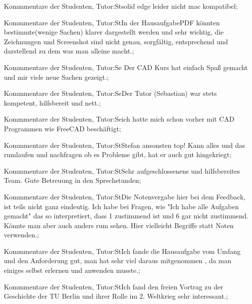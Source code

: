 \documentclass[10pt]{beamer}
\begin{document}
\begin{frame}[fragile]{Kommmentare der Studenten, Tutor:St}solid edge leider nicht mac kompatibel;
 \end{frame}
\begin{frame}[fragile]{Kommmentare der Studenten, Tutor:St}In der HausaufgabePDF könnten bestimmte(wenige Sachen) klarer dargestellt werden und sehr wichtig, die Zeichnungen und Screenshot sind nicht genau, sorgfältig, entsprechend und darstellend zu dem was man alleine macht.;
 \end{frame}
\begin{frame}[fragile]{Kommmentare der Studenten, Tutor:Se}
 Der CAD Kurs hat einfach Spaß gemacht und mir viele neue Sachen gezeigt.;
 \end{frame}
\begin{frame}[fragile]{Kommmentare der Studenten, Tutor:Se}Der Tutor (Sebastian) war stets kompetent, hilfsbereit und nett.;
 \end{frame}
\begin{frame}[fragile]{Kommmentare der Studenten, Tutor:Se}ich hatte mich schon vorher mit CAD Programmen wie FreeCAD beschäftigt;
 \end{frame}
\begin{frame}[fragile]{Kommmentare der Studenten, Tutor:St}Stefan ansonsten top! Kann alles und das rumlaufen und nachfragen ob es Probleme gibt, hat er auch gut hingekriegt;
 \end{frame}
\begin{frame}[fragile]{Kommmentare der Studenten, Tutor:St}Sehr aufgeschlossenens und hilfsbereites Team. Gute Betreuung in den Sprechstunden;
 \end{frame}
\begin{frame}[fragile]{Kommmentare der Studenten, Tutor:St}Die Notenvergabe hier bei dem Feedback, ist teils nicht ganz eindeutig. Ich habe bei Fragen, wie "Ich habe alle Aufgaben gemacht" das so interpretiert, dass 1 zustimmend ist und 6 gar nicht zustimmend. Könnte man aber auch anders rum sehen. Hier vielleicht Begriffe statt Noten verwenden.;
 \end{frame}
\begin{frame}[fragile]{Kommmentare der Studenten, Tutor:St}Ich fande die Hausaufgabe vom Umfang und den Anforderung gut, man hat sehr viel daraus mitgenommen , da man einiges selbst erlernen und anwenden musste.;
 \end{frame}
\begin{frame}[fragile]{Kommmentare der Studenten, Tutor:St}Ich fand den freien Vortrag zu der Geschichte der TU Berlin und ihrer Rolle im 2. Weltkrieg sehr interessant.;
 \end{frame}
\end{document}
